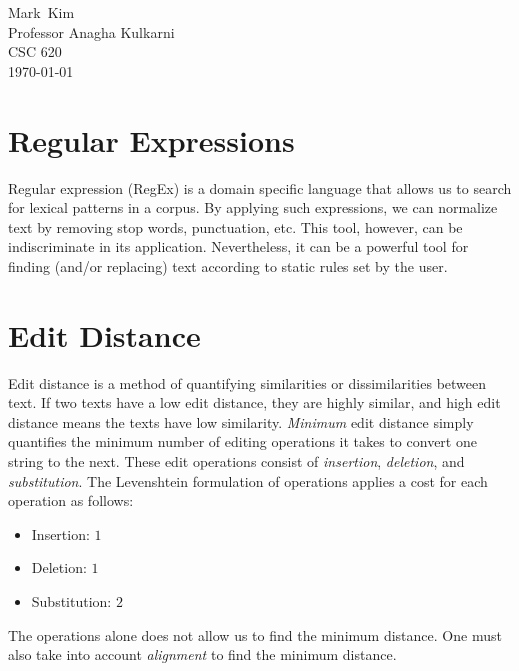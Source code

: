 \documentclass[12pt]{report}
\newcommand{\firstName}{Mark}
\newcommand{\lastName}{Kim}
\newcommand{\instructor}{Professor Anagha Kulkarni}
\newcommand{\course}{CSC 620}
\begin{document}
\begin{flushleft}
\firstName\ \lastName\\
\instructor\\
\course\\
\today\\
\end{flushleft}

\setlength{\parindent}{0.5in}

\section{Regular Expressions}

Regular expression (RegEx) is a domain specific language that allows us to search for
lexical patterns in a corpus.  By applying such expressions, we can normalize
text by removing stop words, punctuation, etc.  This tool, however, can be
indiscriminate in its application.  Nevertheless, it can be a powerful tool for
finding (and/or replacing) text according to static rules set by the user.

\section{Edit Distance}
Edit distance is a method of quantifying similarities or dissimilarities between
text.  If two texts have a low edit distance, they are highly similar, and high
edit distance means the texts have low similarity.  \emph{Minimum} edit
distance simply quantifies the minimum number of editing operations it takes to
convert one string to the next.  These edit operations consist of
\emph{insertion}, \emph{deletion}, and \emph{substitution}.  The Levenshtein
formulation of operations applies a cost for each operation as follows:
\begin{itemize}
  \item Insertion: $1$
  \item Deletion: $1$
  \item Substitution: $2$
\end{itemize}
The operations alone does not allow us to find the minimum distance.  One must
also take into account \emph{alignment} to find the minimum distance.
\end{document}
